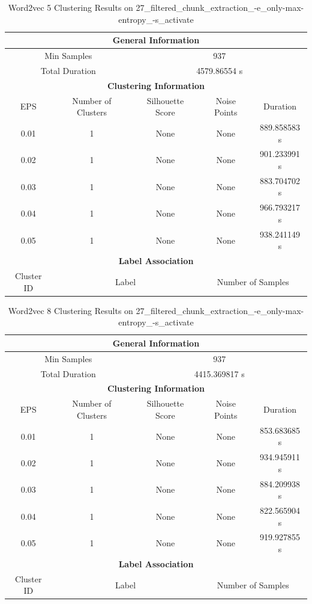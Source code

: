 \begin{longtable}{|c|c|c|c|c|}
\caption{Word2vec 5 Clustering Results on 27\_filtered\_chunk\_extraction\_-e\_only-max-entropy\_-s\_activate} \label{tab:27_filtered_chunk_extraction_-e_only-max-entropy_-s_activate_word2vec_5_clustering_results}\\
\hline
\multicolumn{5}{|c|}{\textbf{General Information}} \\
\hline
\multicolumn{2}{|c|}{Min Samples} & \multicolumn{3}{c|}{937} \\
\multicolumn{2}{|c|}{Total Duration} & \multicolumn{3}{c|}{4579.86554 s} \\
\hline
\multicolumn{5}{|c|}{\textbf{Clustering Information}} \\
\hline
EPS & Number of Clusters & Silhouette Score & Noise Points & Duration \\
0.01 & 1 & None & None & 889.858583 s\\
0.02 & 1 & None & None & 901.233991 s\\
0.03 & 1 & None & None & 883.704702 s\\
0.04 & 1 & None & None & 966.793217 s\\
0.05 & 1 & None & None & 938.241149 s\\
\hline
\multicolumn{5}{|c|}{\textbf{Label Association}} \\
\hline
Cluster ID & \multicolumn{2}{c|}{Label} & \multicolumn{2}{c|}{Number of Samples} \\
\hline
\end{longtable}


\begin{longtable}{|c|c|c|c|c|}
\caption{Word2vec 8 Clustering Results on 27\_filtered\_chunk\_extraction\_-e\_only-max-entropy\_-s\_activate} \label{tab:27_filtered_chunk_extraction_-e_only-max-entropy_-s_activate_word2vec_8_clustering_results}\\
\hline
\multicolumn{5}{|c|}{\textbf{General Information}} \\
\hline
\multicolumn{2}{|c|}{Min Samples} & \multicolumn{3}{c|}{937} \\
\multicolumn{2}{|c|}{Total Duration} & \multicolumn{3}{c|}{4415.369817 s} \\
\hline
\multicolumn{5}{|c|}{\textbf{Clustering Information}} \\
\hline
EPS & Number of Clusters & Silhouette Score & Noise Points & Duration \\
0.01 & 1 & None & None & 853.683685 s\\
0.02 & 1 & None & None & 934.945911 s\\
0.03 & 1 & None & None & 884.209938 s\\
0.04 & 1 & None & None & 822.565904 s\\
0.05 & 1 & None & None & 919.927855 s\\
\hline
\multicolumn{5}{|c|}{\textbf{Label Association}} \\
\hline
Cluster ID & \multicolumn{2}{c|}{Label} & \multicolumn{2}{c|}{Number of Samples} \\
\hline
\end{longtable}



